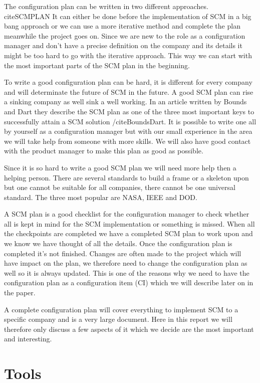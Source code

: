\documentclass[a4paper,10pt]{article}
\begin{document}
The configuration plan can be written in two different approaches.
cite{SCMPLAN} It can either be done before the implementation of SCM in a big bang approach or we can use a more iterative method and complete the plan meanwhile the project goes on.
Since we are new to the role as a configuration manager and don’t have a precise definition on the company and its details it might be too hard to go with the iterative approach.
This way we can start with the most important parts of the SCM plan in the beginning.

To write a good configuration plan can be hard, it is different for every company and will determinate the future of SCM in the future.
A good SCM plan can rise a sinking company as well sink a well working.
In an article written by Bounds and Dart they describe the SCM plan as one of the three most important keys to successfully attain a SCM solution /cite{BoundsDart}.
It is possible to write one all by yourself as a configuration manager but with our small experience in the area we will take help from someone with more skills.
We will also have good contact with the product manager to make this plan as good as possible.

Since it is so hard to write a good SCM plan we will need more help then a helping person. There are several standards to build a frame or a skeleton upon but one cannot be suitable for all companies, there cannot be one universal standard.
The three most popular are NASA, IEEE and DOD. \cite{SCMPLAN}

A SCM plan is a good checklist for the configuration manager to check whether all is kept in mind for the SCM implementation or something is missed.
When all the checkpoints are completed we have a completed SCM plan to work upon and we know we have thought of all the details.
Once the configuration plan is completed it’s not finished.
Changes are often made to the project which will have impact on the plan, we therefore need to change the configuration plan as well so it is always updated.
This is one of the reasons why we need to have the configuration plan as a configuration item (CI) which we will describe later on in the paper.

A complete configuration plan will cover everything to implement SCM to a specific company and is a very large document.
Here in this report we will therefore only discuss a few aspects of it which we decide are the most important and interesting.

\section{Tools}
\end{document}
